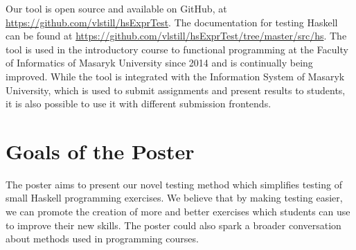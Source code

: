 \documentclass[sigconf]{acmart} %
\begin{document}
Our tool is open source and available on GitHub, at
\url{https://github.com/vlstill/hsExprTest}.
The documentation for testing Haskell can be found at
\url{https://github.com/vlstill/hsExprTest/tree/master/src/hs}.
The tool is used in the introductory course to functional programming at the
Faculty of Informatics of Masaryk University since 2014 and is continually
being improved.
While the tool is integrated with the Information System of Masaryk University,
which is used to submit assignments and present results to students, it is also
possible to use it with different submission frontends.

\section{Goals of the Poster}

The poster aims to present our novel testing method which simplifies testing of
small Haskell programming exercises.
We believe that by making testing easier, we can promote the creation of more
and better exercises which students can use to improve their new skills.
The poster could also spark a broader conversation about methods used in
programming courses.

\balance


\end{document}

